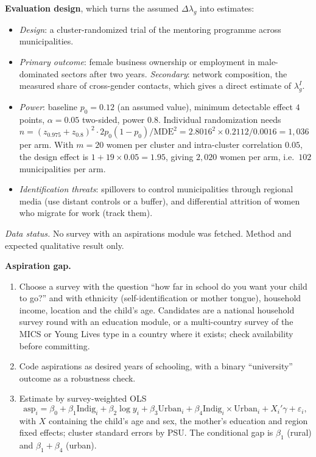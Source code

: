 \documentclass[../solutions_manual.tex]{subfiles}
\begin{document}
\textbf{Evaluation design}, which turns the assumed $\Delta\lambda_g$ into estimates:
\begin{itemize}
\item \emph{Design}: a cluster-randomized trial of the mentoring programme across municipalities.
\item \emph{Primary outcome}: female business ownership or employment in male-dominated sectors after two years. \emph{Secondary}: network composition, the measured share of cross-gender contacts, which gives a direct estimate of $\lambda_g^I$.
\item \emph{Power}: baseline $p_0 = 0.12$ (an assumed value), minimum detectable effect $4$ points, $\alpha = 0.05$ two-sided, power $0.8$. Individual randomization needs $n = (z_{0.975} + z_{0.8})^2 \cdot 2p_0(1-p_0)/\text{MDE}^2 = 2.8016^2 \times 0.2112/0.0016 = 1{,}036$ per arm. With $m = 20$ women per cluster and intra-cluster correlation $0.05$, the design effect is $1 + 19 \times 0.05 = 1.95$, giving $2{,}020$ women per arm, i.e.\ $102$ municipalities per arm.
\item \emph{Identification threats}: spillovers to control municipalities through regional media (use distant controls or a buffer), and differential attrition of women who migrate for work (track them).
\end{itemize}


\emph{Data status.} No survey with an aspirations module was fetched. Method and expected qualitative result only.

 \textbf{Aspiration gap.}
\begin{enumerate}
\item Choose a survey with the question ``how far in school do you want your child to go?'' and with ethnicity (self-identification or mother tongue), household income, location and the child's age. Candidates are a national household survey round with an education module, or a multi-country survey of the MICS or Young Lives type in a country where it exists; check availability before committing.
\item Code aspirations as desired years of schooling, with a binary ``university'' outcome as a robustness check.
\item Estimate by survey-weighted OLS
\[
\text{asp}_i = \beta_0 + \beta_1\text{Indig}_i + \beta_2\log y_i + \beta_3\text{Urban}_i + \beta_4\text{Indig}_i\times\text{Urban}_i + X_i'\gamma + \varepsilon_i,
\]
with $X$ containing the child's age and sex, the mother's education and region fixed effects; cluster standard errors by PSU. The conditional gap is $\beta_1$ (rural) and $\beta_1 + \beta_4$ (urban).
\end{enumerate}
\end{document}

